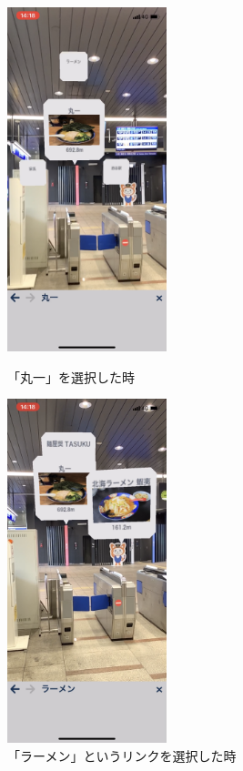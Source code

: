 \begin{figure}[H]
  \begin{minipage}{0.5\hsize}
    \centering
    \includegraphics[height=100mm]{images/nishiya_maruichi_ar.png}
    \caption{「丸一」を選択した時} \label{fig:nishiya_maruichi_ar}
  \end{minipage}
  \begin{minipage}{0.5\hsize}
    \centering
    \includegraphics[height=100mm]{images/nishiya_ramen_ar.png}
    \caption{「ラーメン」というリンクを選択した時} \label{fig:nishiya_ramen_ar}
  \end{minipage}
\end{figure}

